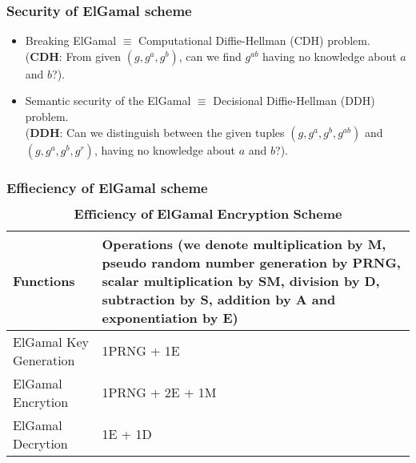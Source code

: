 \documentclass{beamer}
\begin{document}

\begin{frame}[t]
\frametitle{Security of ElGamal scheme}

\begin{itemize}
\item  Breaking ElGamal $\equiv$ Computational Diffie-Hellman (CDH) problem.\\
\vspace*{1mm}
($\textbf{CDH:}$ From given $(g,g^a,g^b)$, can we find $g^{ab}$ having no knowledge about $a$ and $b$?).
\vspace*{5mm}
\item   Semantic security of the ElGamal $\equiv$ Decisional Diffie-Hellman (DDH) problem.\\
\vspace*{1mm} 
($\textbf{DDH:}$ Can we distinguish between the given tuples $(g,g^a,g^b,g^{ab})$ and $(g,g^a,g^b,g^{r})$, having no knowledge about $a$ and $b$?).
\end{itemize}

\end{frame}

\begin{frame}[t]
\frametitle{Effieciency of ElGamal scheme}

\begin{table}
\centering
\caption{$\textbf{Efficiency of ElGamal Encryption Scheme}$}\label{table:Eff. ElGamal}
\begin{tabular}{ |p{4cm}||p{6cm}|  }
 \hline
 \hline
Functions & Operations (we denote multiplication by M, pseudo random number generation by PRNG, scalar multiplication by SM, division by D, subtraction by S, addition by A and exponentiation by E)\\
 \hline\hline
 ElGamal Key Generation   & 1PRNG + 1E \\
 \hline
 ElGamal Encrytion   & 1PRNG + 2E + 1M \\
 \hline
 ElGamal Decrytion   & 1E + 1D  \\
  \hline
\end{tabular}
\end{table}
\end{frame}


\end{document}
